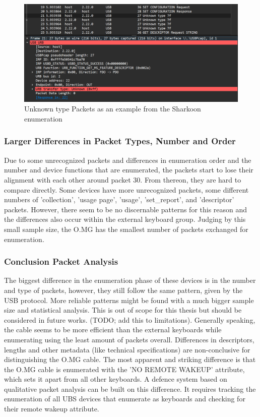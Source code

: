 \begin{figure}[H]
    \centering
    \includegraphics[width=0.75\linewidth]{visuals/unknownPacketsSharkoon.png}
    \caption{Unknown type Packets as an example from the Sharkoon enumeration}
    \label{fig:unknownPacketsSharkoon}
\end{figure}


\subsubsection{Larger Differences in Packet Types, Number and Order}

Due to some unrecognized packets and differences in enumeration order and the number and device functions that are enumerated, the packets start to lose their alignment with each other around packet 30. From thereon, they are hard to compare directly. Some devices have more unrecognized packets, some different numbers of 'collection', 'usage page', 'usage', 'set\_report', and 'descriptor' packets. However, there seem to be no discernable patterns for this reason and the differences also occur within the external keyboard group. Judging by this small sample size, the O.MG has the smallest number of packets exchanged for enumeration. 


\subsubsection{Conclusion Packet Analysis}

The biggest difference in the enumeration phase of these devices is in the number and type of packets, however, they still follow the same pattern, given by the USB protocol. More reliable patterns might be found with a much bigger sample size and statistical analysis. This is out of scope for this thesis but should be considered in future works. (TODO; add this to limitations). Generally speaking, the cable seems to be more efficient than the external keyboards while enumerating using the least amount of packets overall.
Differences in descriptors, lengths and other metadata (like technical specifications) are non-conclusive for distinguishing the O.MG cable. 
The most apparent and striking difference is that the O.MG cable is enumerated with the 'NO REMOTE WAKEUP' attribute, which sets it apart from all other keyboards.
A defence system based on qualitative packet analysis can be built on this difference. It requires tracking the enumeration of all UBS devices that enumerate as keyboards and checking for their remote wakeup attribute. 

